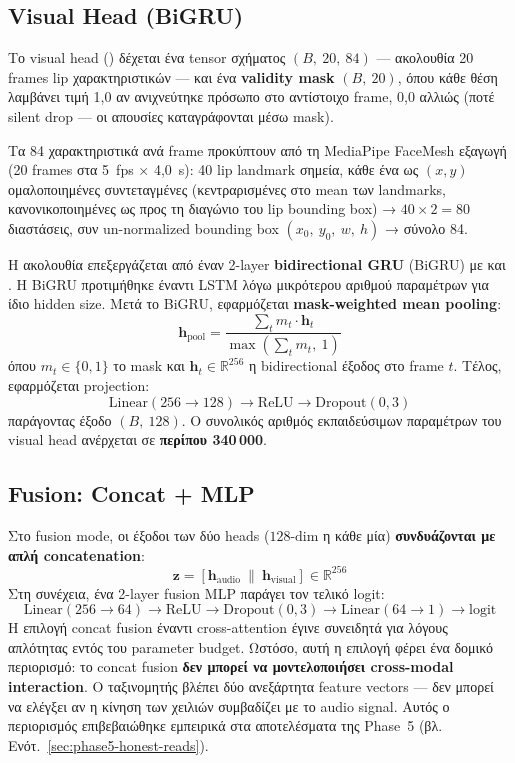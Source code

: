 \subsection{Visual Head (BiGRU)}
\label{subsec:visual-head}

Το visual head () δέχεται ένα tensor
σχήματος \((B,\ 20,\ 84)\) — ακολουθία 20 frames lip χαρακτηριστικών —
και ένα \textbf{validity mask} \((B,\ 20)\),
όπου κάθε θέση λαμβάνει τιμή 1{,}0 αν ανιχνεύτηκε πρόσωπο στο αντίστοιχο frame,
0{,}0 αλλιώς (ποτέ silent drop — οι απουσίες καταγράφονται μέσω mask).

Τα 84 χαρακτηριστικά ανά frame προκύπτουν από τη
MediaPipe FaceMesh εξαγωγή (20 frames στα 5~fps × 4{,}0~s):
40 lip landmark σημεία, κάθε ένα ως \((x, y)\) ομαλοποιημένες συντεταγμένες
(κεντραρισμένες στο mean των landmarks, κανονικοποιημένες ως προς
τη διαγώνιο του lip bounding box) → \(40 \times 2 = 80\) διαστάσεις,
συν un-normalized bounding box \((x_0,\ y_0,\ w,\ h)\) → σύνολο 84.

Η ακολουθία επεξεργάζεται από έναν 2-layer
\textbf{bidirectional GRU} (BiGRU) με 
και .
Η BiGRU προτιμήθηκε έναντι LSTM λόγω μικρότερου αριθμού παραμέτρων
για ίδιο hidden size.
Μετά το BiGRU, εφαρμόζεται \textbf{mask-weighted mean pooling}:
\[
  \mathbf{h}_{\text{pool}} = \frac{\sum_{t} m_t \cdot \mathbf{h}_t}{\max\!\left(\sum_t m_t,\ 1\right)}
\]
όπου \(m_t \in \{0, 1\}\) το mask και \(\mathbf{h}_t \in \mathbb{R}^{256}\)
η bidirectional έξοδος στο frame \(t\).
Τέλος, εφαρμόζεται projection:
\[
  \text{Linear}(256 \to 128) \to \text{ReLU} \to \text{Dropout}(0{,}3)
\]
παράγοντας έξοδο \((B,\ 128)\).
Ο συνολικός αριθμός εκπαιδεύσιμων παραμέτρων του visual head
ανέρχεται σε \textbf{περίπου 340\,000}.

\subsection{Fusion: Concat + MLP}
\label{subsec:fusion-head}

Στο fusion mode, οι έξοδοι των δύο heads (\(128\text{-dim}\) η κάθε μία)
\textbf{συνδυάζονται με απλή concatenation}:
\[
  \mathbf{z} = [\mathbf{h}_{\text{audio}}\ \|\ \mathbf{h}_{\text{visual}}]
  \in \mathbb{R}^{256}
\]
Στη συνέχεια, ένα 2-layer fusion MLP παράγει τον τελικό logit:
\[
  \text{Linear}(256 \to 64) \to \text{ReLU} \to \text{Dropout}(0{,}3)
  \to \text{Linear}(64 \to 1) \to \text{logit}
\]
Η επιλογή concat fusion έναντι cross-attention έγινε συνειδητά
για λόγους απλότητας εντός του parameter budget.
Ωστόσο, αυτή η επιλογή φέρει ένα δομικό περιορισμό:
το concat fusion \textbf{δεν μπορεί να μοντελοποιήσει
cross-modal interaction}.
Ο ταξινομητής βλέπει δύο ανεξάρτητα feature vectors —
δεν μπορεί να ελέγξει αν η κίνηση των χειλιών συμβαδίζει
με το audio signal.
Αυτός ο περιορισμός επιβεβαιώθηκε εμπειρικά στα αποτελέσματα της Phase~5
(βλ. Ενότ.~\ref{sec:phase5-honest-reads}).

